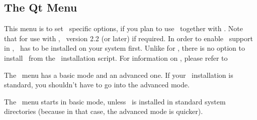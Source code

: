 
\subsection{The Qt Menu}\label{sec:qt-menu}

This menu is to set \qt\ specific options, if you plan to use \qt\ 
together with \cgal . Note that for use with \cgal, \qt\ version 2.2
(or later) if required. In order to enable \qt\ support in \cgal, \qt\ 
has to be installed on your system first. Unlike for \gmp, there is no
option to install \qt\ from the \cgal\ installation script.  For
information on \qt, please refer to
\begin{quote}
  \qtpage
\end{quote}

\begin{ccAdvanced}
  The \qt\ menu has a basic mode and an advanced one. If your \qt\ 
  installation is standard, you shouldn't have to go into the advanced
  mode.
  
  The \qt\ menu starts in basic mode, unless \qt\ is installed in
  standard system directories (because in that case, the advanced mode
  is quicker).
\end{ccAdvanced}

